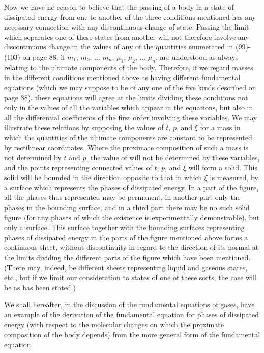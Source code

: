 \documentclass[12pt]{article}
\begin{document}
Now we have no reason to believe that the passing of a body in a state of dissipated energy from one to another of the three conditions mentioned has any necessary connection with any discontinuous change of state. Passing the limit which separates one of these states from another will not therefore involve any discontinuous change in the values of any of the quantities enumerated in (99)-(103) on page 88, if $m_1$, $m_2$, ... $m_n$, $\mu_1$, $\mu_2$, ... $\mu_n$, are understood as always relating to the ultimate components of the body. Therefore, if we regard masses in the different conditions mentioned above as having different fundamental equations (which we may suppose to be of any one of the five kinds described on page 88), these equations will agree at the limits dividing these conditions not only in the values of all the variables which appear in the equations, but also in all the differential coefficients of the first order involving these variables. We may illustrate these relations by supposing the values of $t$, $p$, and $\xi$ for a mass in which the quantities of the ultimate components are constant to be represented by rectilinear coordinates. Where the proximate composition of such a mass is not determined by $t$ and $p$, the value of  will not be determined by these variables, and the points representing connected values of $t$, $p$, and $\xi$ will form a solid. This solid will be bounded in the direction opposite to that in which $\xi$ is measured, by a surface which represents the phases of dissipated energy. In a part of the figure, all the phases thus represented may be permanent, in another part only the phases in the bounding surface, and in a third part there may be no such solid figure (for any phases of which the existence is experimentally demonstrable), but only a surface. This surface together with the bounding surfaces representing phases of dissipated energy in the parts of the figure mentioned above forms a continuous sheet, without discontinuity in regard to the direction of its normal at the limits dividing the different parts of the figure which have been mentioned. (There may, indeed, be different sheets representing liquid and gaseous states, etc., but if we limit our consideration to states of one of these sorts, the case will be as has been stated.)


We shall hereafter, in the discussion of the fundamental equations of gases, have an example of the derivation of the fundamental equation for phases of dissipated energy (with respect to the molecular changes on which the proximate composition of the body depends) from the more general form of the fundamental equation.
\end{document}
